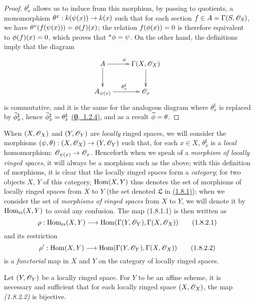 \begin{proof}
$\theta_x^\sharp$ allows us to induce from this morphism, by passing to quotients, a
monomorphism $\theta^x:k(\psi(x))\to k(x)$ such that for each section
$f\in A=\Gamma(S,\mathscr{O}_S)$, we have $\theta^x(f(\psi(x)))=\phi(f)(x)$; the relation
$f(\phi(x))=0$ is therefore equivalent to $\phi(f)(x)=0$, which proves that
${}^a\phi=\psi$. On the other hand, the definitions imply that the diagram
\[
  \xymatrix{
    A\ar[r]^\vphi\ar[d] &
    \Gamma(X,\OO_X)\ar[d]\\
    A_{\psi(x)}\ar[r]^{\theta_x^\sharp} &
    \OO_x
  }
\]
is commutative, and it is the same for the analogous diagram where $\theta_x^\sharp$ is
replaced by $\widetilde{\phi}_x^\sharp$, hence $\widetilde{\phi}_x^\sharp=\theta_x^\sharp$
\hyperref[env-0.1.2.4]{(\textbf{0},~1.2.4)}, and as a result $\widetilde{\phi}=\theta$.
\end{proof}

\begin{env}[1.8.2]
\label{env-1.1.8.2}
When $(X,\mathscr{O}_X)$ and $(Y,\mathscr{O}_Y)$ are {\it locally} ringed spaces, we will consider the
morphisms $(\psi,\theta):(X,\mathscr{O}_X)\to(Y,\mathscr{O}_Y)$ such that, for each $x\in X$,
$\theta_x^\sharp$ is a {\it local} homomorphism: $\mathscr{O}_{\psi(x)}\to\mathscr{O}_x$. Henceforth when
we speak
of a {\it morphism of locally ringed spaces}, it will always be a morphism such as the
above; with this definition of morphisms, it is clear that the locally ringed spaces form a
{\it category}; for two objects $X$, $Y$ of this category, ${\mathop{\mathrm{Hom}}\nolimits}(X,Y)$ thus denotes the set
of morphisms of locally ringed spaces from $X$ to $Y$ (the set denoted $\mathfrak{L}$ in
\hyperref[prop-1.1.8.1]{(1.8.1)}); when we consider the set of {\it morphisms of ringed spaces} from $X$
to $Y$, we will denote it by ${\mathop{\mathrm{Hom}}\nolimits}_\text{rs}(X,Y)$ to avoid any confusion. The map (1.8.1.1)
is then written as
\[
  \rho:{\mathop{\mathrm{Hom}}\nolimits}_\text{rs}(X,Y)\longrightarrow{\mathop{\mathrm{Hom}}\nolimits}(\Gamma(Y,\mathscr{O}_Y),\Gamma(X,\mathscr{O}_X))
  \tag{1.8.2.1}
\]
and its restriction
\[
  \rho':{\mathop{\mathrm{Hom}}\nolimits}(X,Y)\longrightarrow{\mathop{\mathrm{Hom}}\nolimits}(\Gamma(Y,\mathscr{O}_Y),\Gamma(X,\mathscr{O}_X))
  \tag{1.8.2.2}
\]
is a {\it functorial} map in $X$ and $Y$ on the category of locally ringed spaces.
\end{env}

\begin{cor}[1.8.3]
\label{cor-1.1.8.3}
Let $(Y,\mathscr{O}_Y)$ be a locally ringed space. For $Y$ to be an affine scheme, it is necessary
and sufficient that for each locally ringed space $(X,\mathscr{O}_X)$, the map {\it (1.8.2.2)} is
bijective.
\end{cor}

